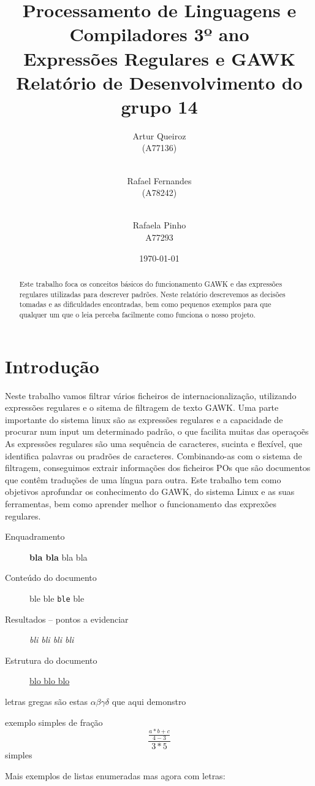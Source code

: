 \documentclass{report}
\title{Processamento de Linguagens e Compiladores 3º ano\\ \textbf{Expressões Regulares e GAWK}\\ Relatório de Desenvolvimento do grupo 14}
\author{Artur Queiroz\\ (A77136) \and \\ Rafael Fernandes\\ (A78242) \and \\ Rafaela Pinho\\ A77293  }
\date{\today}
\begin{document}
\maketitle

\begin{abstract}
Este trabalho foca os conceitos básicos do funcionamento GAWK e das expressões regulares utilizadas para descrever padrões.
Neste relatório descrevemos as decisões tomadas e as dificuldades encontradas, bem como pequenos exemplos para que qualquer um que o leia perceba facilmente como funciona o nosso projeto.
\end{abstract}

\tableofcontents

\chapter{Introdução} \label{intro}
Neste trabalho vamos filtrar vários ficheiros de internacionalização, utilizando expressões regulares e o sitema de filtragem de texto GAWK. Uma parte importante do sistema linux são as expressões regulares e a capacidade de procurar num input um determinado padrão, o que facilita muitas das operaçoẽs
As expressões regulares são uma sequência de caracteres, sucinta e flexível, que identifica palavras ou pradrões de caracteres. Combinando-as com o sistema de filtragem, conseguimos extrair informações dos ficheiros POs que são documentos que contêm traduções de uma língua para outra.
Este trabalho tem como objetivos aprofundar os conhecimento do GAWK, do sistema Linux e as suas ferramentas, bem como aprender melhor o funcionamento das exprexões regulares.



\begin{description}
  \item [Enquadramento] \textbf{bla bla} bla bla
  \item [Conteúdo do documento] \textsf{ble ble} \texttt{ble} ble
  \item [Resultados -- pontos a evidenciar] \textit{bli bli bli bli}
  \item [Estrutura do documento] \underline{blo blo blo}
\end{description}

letras gregas são estas $ \alpha \beta \gamma \delta $ que aqui demonstro

exemplo simples de fração \[ \frac{\frac{a * b + c}{4-3}}{3*5} \] simples

Mais exemplos de listas enumeradas mas agora com letras:
\end{document}
